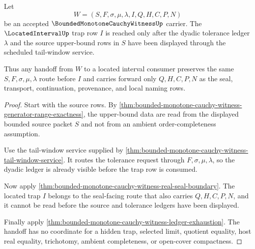 \begin{theorem}
\label{thm:bounded-monotone-cauchy-witness-located-trap-handoff}
Let
$$
W=(S,F,\sigma,\mu,\lambda,I,Q,H,C,P,N)
$$
be an accepted $\BoundedMonotoneCauchyWitnessUp$ carrier. The $\LocatedIntervalUp$ trap row $I$ is reached only after the dyadic tolerance ledger $\lambda$ and the source upper-bound rows in $S$ have been displayed through the scheduled tail-window service.

Thus any handoff from $W$ to a located interval consumer preserves the same $S,F,\sigma,\mu,\lambda$ route before $I$ and carries forward only $Q,H,C,P,N$ as the seal, transport, continuation, provenance, and local naming rows.
\end{theorem}
\begin{proof}
Start with the source rows. By \autoref{thm:bounded-monotone-cauchy-witness-generator-range-exactness}, the upper-bound data are read from the displayed bounded source packet $S$ and not from an ambient order-completeness assumption.

Use the tail-window service supplied by \autoref{thm:bounded-monotone-cauchy-witness-tail-window-service}. It routes the tolerance request through $F,\sigma,\mu,\lambda$, so the dyadic ledger is already visible before the trap row is consumed.

Now apply \autoref{thm:bounded-monotone-cauchy-witness-real-seal-boundary}. The located trap $I$ belongs to the seal-facing route that also carries $Q,H,C,P,N$, and it cannot be read before the source and tolerance ledgers have been displayed.

Finally apply \autoref{thm:bounded-monotone-cauchy-witness-ledger-exhaustion}. The handoff has no coordinate for a hidden trap, selected limit, quotient equality, host real equality, trichotomy, ambient completeness, or open-cover compactness.
\end{proof}

